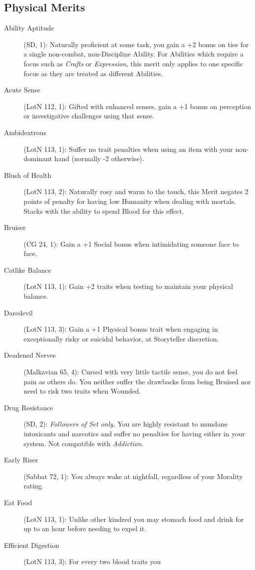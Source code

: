 \subsection{Physical Merits}
\begin{description}
	\item[Ability Aptitude] (SD, 1):  Naturally proficient at some task, 
	you gain a +2 bonus on ties for a single non-combat, non-Discipline Ability. 
	For Abilities which require a focus such as \emph{Crafts} or \emph{Expression}, 
	this merit only applies to one specific focus as they are treated as different 
	Abilities.
	\item[Acute Sense] (LotN 112, 1):  Gifted with enhanced senses, gain a +1 
	bonus on perception or investigative challenges using that sense.
	\item[Ambidextrous] (LotN 113, 1):  Suffer no trait penalties when using an item 
	with your non-dominant hand (normally -2 otherwise).
	\item[Blush of Health] (LotN 113, 2):  Naturally rosy and warm to the touch, 
	this Merit negates 2 points of penalty for having low Humanity when dealing 
	with mortals. Stacks with the ability to spend Blood for this effect.
	\item[Bruiser] (CG 24, 1):  Gain a +1 Social bonus when intimidating someone face to face.
	\item[Catlike Balance] (LotN 113, 1):  Gain +2 traits when testing to maintain 
	your physical balance.
	\item[Daredevil] (LotN 113, 3):  Gain a +1 Physical bonus trait when engaging in 
	exceptionally risky or suicidal behavior, at Storyteller discretion.
	\item[Deadened Nerves] (Malkavian 65, 4):  Cursed with very little tactile 
	sense, you do not feel pain as others do.  You neither suffer the drawbacks 
	from being Bruised nor need to risk two traits when Wounded.
	\item[Drug Resistance] (SD, 2):  \emph{Followers of Set only.}  You are 
	highly resistant to mundane intoxicants and narcotics and suffer no penalties for 
	having either in your system.  Not compatible with \emph{Addiction}.
	\item[Early Riser] (Sabbat 72, 1):  You always wake at nightfall, regardless of 
	your Morality rating.
	\item[Eat Food] (LotN 113, 1):  Unlike other kindred you may stomach food 
	and drink for up to an hour before needing to expel it.
	\item[Efficient Digestion] (LotN 113, 3):  For every two blood traits you 

\end{description}
